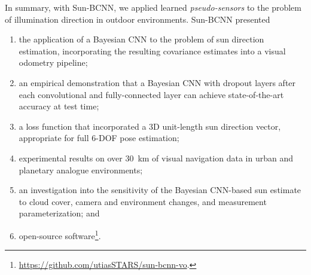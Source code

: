 In summary, with Sun-BCNN, we applied learned \textit{pseudo-sensors} to the problem of illumination direction in outdoor environments. Sun-BCNN presented
\begin{enumerate}
\item the application of a Bayesian CNN to the problem of sun direction estimation, incorporating the resulting covariance estimates into a visual odometry pipeline; 
\item an empirical demonstration that a Bayesian CNN with dropout layers after each convolutional and fully-connected layer can achieve state-of-the-art accuracy at test time;
\item a loss function that incorporated a 3D unit-length sun direction vector, appropriate for full 6-DOF pose estimation;
\item experimental results on over 30~km of visual navigation data in urban \citep{Geiger2012-fq} and planetary analogue \citep{Furgale2012-kk} environments; 
\item an investigation into the sensitivity of the Bayesian CNN-based sun estimate to cloud cover, camera and environment changes, and measurement parameterization; and
\item open-source software\footnote{\url{https://github.com/utiasSTARS/sun-bcnn-vo}.}.
\end{enumerate}

